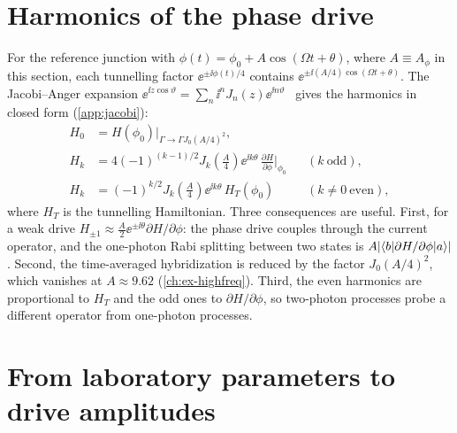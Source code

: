 \section{Harmonics of the phase drive}\label{sec:jacobi-anger}

For the reference junction with $\phi(t)=\phi_0+A\cos(\Omega t+\theta)$, where $A\equiv A_\phi$
in this section, each tunnelling factor $\ee^{\pm\ii\phi(t)/4}$ contains
$\ee^{\pm\ii(A/4)\cos(\Omega t+\theta)}$. The Jacobi--Anger expansion
$\ee^{\ii z\cos\vartheta}=\sum_n\ii^nJ_n(z)\ee^{\ii n\vartheta}$~\cite{olver2026nist}
gives the harmonics in closed form (\cref{app:jacobi}):
\begin{align}
  H_0&=H(\phi_0)\big\vert_{\Gamma\to\Gamma J_0(A/4)^2},\label{eq:phase-h0}\\
  H_k&=4(-1)^{(k-1)/2}J_k\!\left(\tfrac A4\right)\ee^{\ii k\theta}\,\frac{\partial H}{\partial\phi}\bigg\vert_{\phi_0}
  &&(k\ \mathrm{odd}),\label{eq:phase-hk}\\
  H_k&=(-1)^{k/2}J_k\!\left(\tfrac A4\right)\ee^{\ii k\theta}\,H_T(\phi_0)&&(k\ne0\ \mathrm{even}),
\end{align}
where $H_T$ is the tunnelling Hamiltonian. Three consequences are useful. First, for a weak drive
$H_{\pm1}\approx\tfrac A2\ee^{\pm\ii\theta}\partial H/\partial\phi$: the phase drive
couples through the current operator, and the one-photon Rabi splitting between two states
is $A\lvert \langle b\vert \partial H/\partial\phi\vert a\rangle\rvert$. Second, the time-averaged hybridization is
reduced by the factor $J_0(A/4)^2$, which vanishes at $A\approx9.62$ (\cref{ch:ex-highfreq}).
Third, the even harmonics are proportional to $H_T$ and the odd ones to
$\partial H/\partial\phi$, so two-photon processes probe a different operator from
one-photon processes.

\section{From laboratory parameters to drive amplitudes}\label{sec:lab-units}

